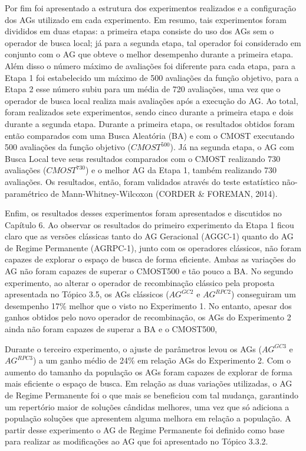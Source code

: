Por fim foi apresentado a estrutura dos experimentos realizados e a configuração dos AGs utilizado em cada experimento. Em resumo, tais experimentos foram divididos em duas etapas: a primeira etapa consiste do uso dos AGs sem o operador de busca local; já para a segunda etapa, tal operador foi considerado em conjunto com o AG que obteve o melhor desempenho durante a primeira etapa. Além disso o número máximo de avaliações foi diferente para cada etapa, para a Etapa 1 foi estabelecido um máximo de 500 avaliações da função objetivo, para a Etapa 2 esse número subiu para um média de 720 avaliações, uma vez que o operador de busca local realiza mais avaliações após a execução do AG. Ao total, foram realizados sete experimentos, sendo cinco durante a primeira etapa e dois durante a segunda etapa. Durante a primeira etapa, os resultados obtidos foram então comparados com uma Busca Aleatória (BA) e com o CMOST executando 500 avaliações da função objetivo ($CMOST^{500}$). Já na segunda etapa, o AG com Busca Local teve seus resultados comparados com o CMOST realizando 730 avaliações ($CMOST^{730}$) e o melhor AG da Etapa 1, também realizando 730 avaliações. Os resultados, então, foram validados através do teste estatístico não-paramétrico de Mann-Whitney-Wilcoxon (CORDER \& FOREMAN, 2014). 

Enfim, os resultados desses experimentos foram apresentados e discutidos no Capítulo 6. Ao observar os resultados do primeiro experimento da Etapa 1 ficou claro que as versões clássicas tanto do AG Geracional (AGGC-1) quanto do AG de Regime Permanente (AGRPC-1), junto com os operadores clássicos, não foram capazes de explorar o espaço de busca de forma eficiente.  Ambas as variações do AG não foram capazes de superar o CMOST500 e tão pouco a BA. No segundo experimento, ao alterar o operador de recombinação clássico pela proposta apresentada no Tópico 3.5, os AGs clássicos ($AG^{GC2}$ e $AG^{RPC2}$) conseguiram um desempenho 17\% melhor que o visto no Experimento 1. No entanto, apesar dos ganhos obtidos pelo novo operador de recombinação, os AGs do Experimento 2 ainda não foram capazes de superar a BA e o CMOST500, 

Durante o terceiro experimento, o ajuste de parâmetros levou os AGs ($AG^{GC3}$ e $AG^{RPC3}$) a um ganho médio de 24\% em relação AGs do Experimento 2. Com o aumento do tamanho da população os AGs foram capazes de explorar de forma mais eficiente o espaço de busca. Em relação as duas variações utilizadas, o AG de Regime Permanente foi o que mais se beneficiou com tal mudança, garantindo um repertório maior de soluções cândidas melhores, uma vez que só adiciona a população soluções que apresentem alguma melhora em relação a população. A partir desse experimento o AG de Regime Permanente foi definido como base para realizar as modificações ao AG que foi apresentado no Tópico 3.3.2. 

